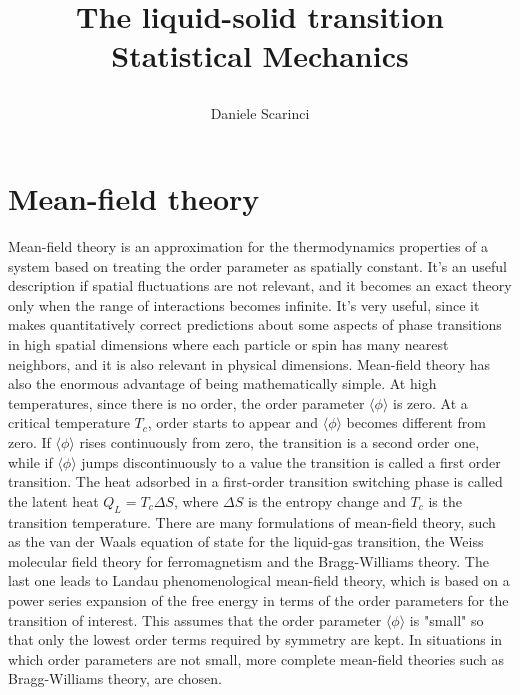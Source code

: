 \documentclass[12pt,a4paper]{article}
\title{The liquid-solid transition
	\\{\small{Statistical Mechanics}}
\author{\small{Daniele Scarinci}}}
\begin{document}
 
\maketitle
{}

\tableofcontents

\section {Mean-field theory}

Mean-field theory is an approximation for the thermodynamics properties of a system based on treating the order parameter as spatially constant. It's an useful description if spatial fluctuations are not relevant, and it becomes an exact theory only when the range of interactions becomes infinite. It's very useful, since it makes quantitatively correct predictions about some aspects of phase transitions in high spatial dimensions where each particle or spin has many nearest neighbors, and it is also relevant in physical dimensions. Mean-field theory has also the enormous advantage of being mathematically simple.
At high temperatures, since there is no order, the order parameter $\langle \phi \rangle$ is zero. At a critical temperature $T_c$, order starts to appear and $\langle \phi \rangle$ becomes different from zero. If $\langle \phi \rangle$ rises continuously from zero, the transition is a second order one, while if $\langle \phi \rangle$ jumps discontinuously to a value the transition is called a first order transition. The heat adsorbed in a first-order transition switching phase is called the latent heat $Q_L=T_c \Delta S$, where $ \Delta S$ is the entropy change and $T_c$ is the transition temperature.
There are many formulations of mean-field theory, such as the van der Waals equation of state for the liquid-gas transition, the Weiss molecular field theory for ferromagnetism and the Bragg-Williams theory. The last one leads to Landau phenomenological mean-field theory, which is based on a power series expansion of the free energy in terms of the order parameters for the transition of interest. This assumes that the order parameter $\langle \phi \rangle$ is "small" so that only the lowest order terms required by symmetry are kept. In situations in which order parameters are not small, more complete mean-field theories such as Bragg-Williams theory, are chosen.
\end{document}
